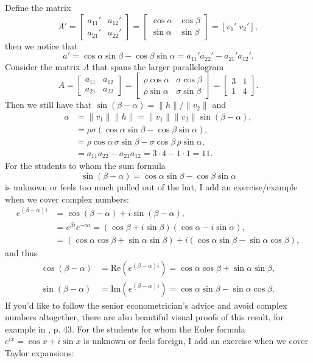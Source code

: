 \documentclass[10pt]{article}
\begin{document}
Define the matrix
\[
A' = \left[\begin{array}{cc}
a_{11}' & a_{12}' \\
a_{21}' & a_{22}'
\end{array}\right] =
\left[\begin{array}{cc}
\cos\alpha & \cos\beta \\
\sin\alpha & \sin\beta
\end{array}\right] = [v_1'\; v_2'],
\]
then we notice that
\[
a' = \cos\alpha \sin\beta - \cos\beta\sin\alpha = a_{11}' a_{22}' - a_{21}' a_{12}'.
\]
Consider the matrix $A$ that spans the larger parallelogram
\[
A = \left[\begin{array}{cc}
a_{11} & a_{12}\\
a_{21} & a_{22}
\end{array}\right] =
\left[\begin{array}{cc}
\rho\cos\alpha & \sigma\cos\beta \\
\rho\sin\alpha & \sigma\sin\beta
\end{array}\right] =
\left[\begin{array}{cc}
3 & 1 \\
1 & 4
\end{array}\right].
\]
Then we still have that $\sin(\beta-\alpha)= \|h\|/\|v_2\|$ and
\begin{align*}
a &= \|v_1\| \|h\| = \|v_1\| \|v_2\| \sin(\beta-\alpha),\\
 &= \rho\sigma (\cos\alpha \sin\beta - \cos\beta\sin\alpha), \\
 &= \rho\cos\alpha \,\sigma\sin\beta - \sigma\cos\beta\,\rho\sin\alpha,\\
 &= a_{11} a_{22} - a_{21} a_{12} = 3\cdot 4 - 1\cdot 1 = 11.
\end{align*}
For the students to whom the sum formula
\[
\sin(\beta-\alpha) = \cos\alpha\sin\beta-\cos\beta\sin\alpha
\]
is unknown or feels too much pulled out of the hat, I add an exercise/example when we cover complex numbers:
\begin{align*}
e^{(\beta-\alpha)i} &= \cos(\beta-\alpha) + i \sin(\beta-\alpha),\\
 &= e^{\beta i}e^{-\alpha i} = (\cos\beta + i\sin\beta)(\cos\alpha - i\sin\alpha),\\
 &= (\cos\alpha\cos\beta + \sin\alpha\sin\beta) + i(\cos\alpha\sin\beta - \sin\alpha\cos\beta),
\end{align*}
and thus
\begin{align*}
\cos(\beta-\alpha) &= \text{Re}(e^{(\beta-\alpha)i}) = \cos\alpha\cos\beta + \sin\alpha\sin\beta,\\
\sin(\beta-\alpha) &= \text{Im}(e^{(\beta-\alpha)i}) = \cos\alpha\sin\beta - \sin\alpha\cos\beta.
\end{align*}
If you'd like to follow the senior econometrician's advice and avoid complex numbers altogether, there are also beautiful visual proofs of this result, for example in \cite{Nelsen2000}, p. 43. For the students for whom the Euler formula $e^{ix}=\cos x + i\sin x$ is unknown or feels foreign, I add an exercise when we cover Taylor expansions:
\end{document}
